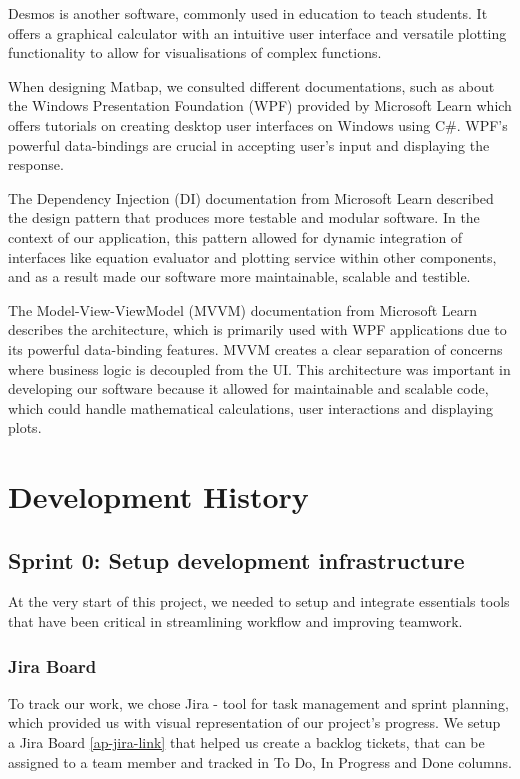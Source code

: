 \documentclass[a4paper, oneside, 11pt]{report}
\begin{document}
Desmos\cite{Desmos:2023} is another software, commonly used in education to teach students. It offers a graphical calculator with an intuitive user interface and versatile plotting functionality to allow for visualisations of complex functions.

When designing Matbap, we consulted different documentations, such as about the Windows Presentation Foundation (WPF)\cite{WPF:2023} provided by Microsoft Learn which offers tutorials on creating desktop user interfaces on Windows using C\#. WPF’s powerful data-bindings are crucial in accepting user's input and displaying the response.

The Dependency Injection (DI) \cite{DI:2023} documentation from Microsoft Learn described the design pattern that produces more testable and modular software. In the context of our application, this pattern allowed for dynamic integration of interfaces like equation evaluator and plotting service within other components, and as a result made our software more maintainable, scalable and testible.

The Model-View-ViewModel (MVVM)\cite{MVVM:2022} documentation from Microsoft Learn describes the architecture, which is primarily used with WPF applications due to its powerful data-binding features. MVVM creates a clear separation of concerns where business logic is decoupled from the UI. This architecture was important in developing our software because it allowed for maintainable and scalable code, which could handle mathematical calculations, user interactions and displaying plots.


\chapter{Development History}\label{Chap:DevHist}

\section{Sprint 0: Setup development infrastructure}
At the very start of this project, we needed to setup and integrate essentials tools that have been critical in streamlining workflow and improving teamwork.

\subsection{Jira Board}
To track our work, we chose Jira\cite{Atlassian:JIRA} - tool for task management and sprint planning, which provided us with visual representation of our project's progress. We setup a Jira Board \ref{ap-jira-link} that helped us create a backlog tickets, that can be assigned to a team member and tracked in To Do, In Progress and Done columns.
\end{document}

